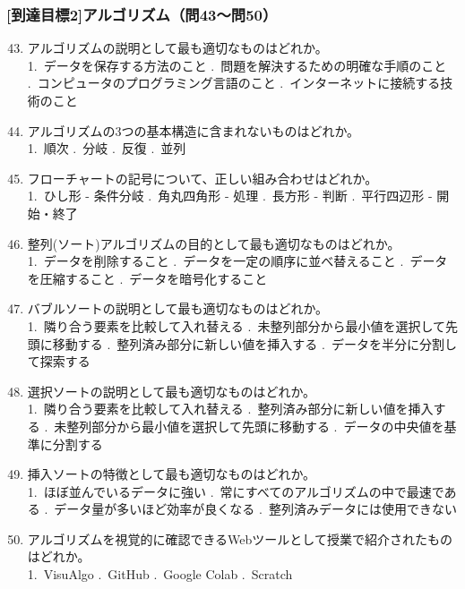 \documentclass[b4paper,7pt,twocolumn,landscape]{jsarticle}
\begin{document}
\subsubsection*{[到達目標2]アルゴリズム（問43〜問50）}
\begin{enumerate}
\setcounter{enumi}{42}
\item アルゴリズムの説明として最も適切なものはどれか。\\
1.~データを保存する方法のこと .~問題を解決するための明確な手順のこと .~コンピュータのプログラミング言語のこと .~インターネットに接続する技術のこと
\item アルゴリズムの3つの基本構造に含まれないものはどれか。\\
1.~順次 .~分岐 .~反復 .~並列
\item フローチャートの記号について、正しい組み合わせはどれか。\\
1.~ひし形 - 条件分岐 .~角丸四角形 - 処理 .~長方形 - 判断 .~平行四辺形 - 開始・終了
\item 整列(ソート)アルゴリズムの目的として最も適切なものはどれか。\\
1.~データを削除すること .~データを一定の順序に並べ替えること .~データを圧縮すること .~データを暗号化すること
\item バブルソートの説明として最も適切なものはどれか。\\
1.~隣り合う要素を比較して入れ替える .~未整列部分から最小値を選択して先頭に移動する .~整列済み部分に新しい値を挿入する .~データを半分に分割して探索する
\item 選択ソートの説明として最も適切なものはどれか。\\
1.~隣り合う要素を比較して入れ替える .~整列済み部分に新しい値を挿入する .~未整列部分から最小値を選択して先頭に移動する .~データの中央値を基準に分割する
\item 挿入ソートの特徴として最も適切なものはどれか。\\
1.~ほぼ並んでいるデータに強い .~常にすべてのアルゴリズムの中で最速である .~データ量が多いほど効率が良くなる .~整列済みデータには使用できない
\item アルゴリズムを視覚的に確認できるWebツールとして授業で紹介されたものはどれか。\\
1.~VisuAlgo .~GitHub .~Google Colab .~Scratch
\end{enumerate}
\end{document}
